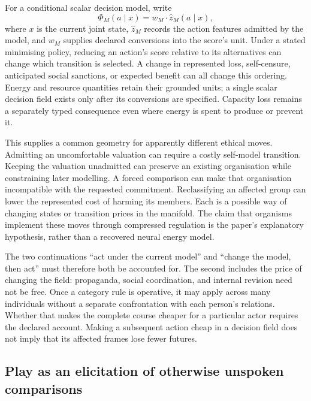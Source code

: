 \documentclass[11pt,a4paper]{article}
\theoremstyle{remark}
\begin{document}
For a conditional scalar decision model, write
\begin{equation}\label{eq:model-field}
\Phi_M(a\mid x)=w_M\cdot\widehat z_M(a\mid x),
\end{equation}
where $x$ is the current joint state, $\widehat z_M$ records the action features
admitted by the model, and $w_M$ supplies declared conversions into the score's
unit. Under a stated minimising policy, reducing an action's score relative to
its alternatives can change which transition is selected. A change in represented
loss, self-censure, anticipated social sanctions, or expected benefit can all
change this ordering. Energy and resource quantities retain their grounded units;
a single scalar decision field exists only after its conversions are specified.
Capacity loss remains a separately typed consequence even where energy is spent
to produce or prevent it.

This supplies a common geometry for apparently different ethical moves.
Admitting an uncomfortable valuation can require a costly self-model transition.
Keeping the valuation unadmitted can preserve an existing organisation while
constraining later modelling. A forced comparison can make that organisation
incompatible with the requested commitment. Reclassifying an affected group
can lower the represented cost of harming its members. Each is a possible way
of changing states or transition prices in the manifold. The claim that organisms
implement these moves through compressed regulation is the paper's explanatory
hypothesis, rather than a recovered neural energy model.

The two continuations ``act under the current model'' and ``change the model,
then act'' must therefore both be accounted for. The second includes the price
of changing the field: propaganda, social coordination, and internal revision
need not be free. Once a category rule is operative, it may apply across many
individuals without a separate confrontation with each person's relations.
Whether that makes the complete course cheaper for a particular actor requires
the declared account. Making a subsequent action cheap in a decision field does
not imply that its affected frames lose fewer futures.

\subsection{Play as an elicitation of otherwise unspoken comparisons}
\end{document}
